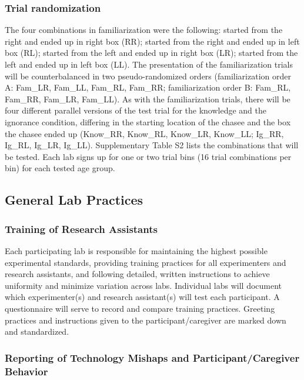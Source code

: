 \documentclass[
  man, donotrepeattitle,floatsintext]{apa6}
\begin{document}
\subsubsection{Trial randomization}\label{trial-randomization}

The four combinations in familiarization were the following: started from the right and ended up in right box (RR); started from the right and ended up in left box (RL); started from the left and ended up in right box (LR); started from the left and ended up in left box (LL). The presentation of the familiarization trials will be counterbalanced in two pseudo-randomized orders (familiarization order A: Fam\_LR, Fam\_LL, Fam\_RL, Fam\_RR; familiarization order B: Fam\_RL, Fam\_RR, Fam\_LR, Fam\_LL). As with the familiarization trials, there will be four different parallel versions of the test trial for the knowledge and the ignorance condition, differing in the starting location of the chasee and the box the chasee ended up (Know\_RR, Know\_RL, Know\_LR, Know\_LL; Ig\_RR, Ig\_RL, Ig\_LR, Ig\_LL). Supplementary Table S2 lists the combinations that will be tested. Each lab signs up for one or two trial bins (16 trial combinations per bin) for each tested age group.

\subsection{General Lab Practices}\label{general-lab-practices}

\subsubsection{Training of Research Assistants}\label{training-of-research-assistants}

Each participating lab is responsible for maintaining the highest possible experimental standards, providing training practices for all experimenters and research assistants, and following detailed, written instructions to achieve uniformity and minimize variation across labs. Individual labs will document which experimenter(s) and research assistant(s) will test each participant. A questionnaire will serve to record and compare training practices. Greeting practices and instructions given to the participant/caregiver are marked down and standardized.

\subsubsection{Reporting of Technology Mishaps and Participant/Caregiver Behavior}\label{reporting-of-technology-mishaps-and-participantcaregiver-behavior}
\end{document}
